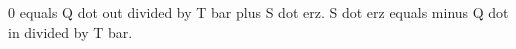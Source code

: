 0 equals Q dot out divided by T bar plus S dot erz.  
S dot erz equals minus Q dot in divided by T bar.